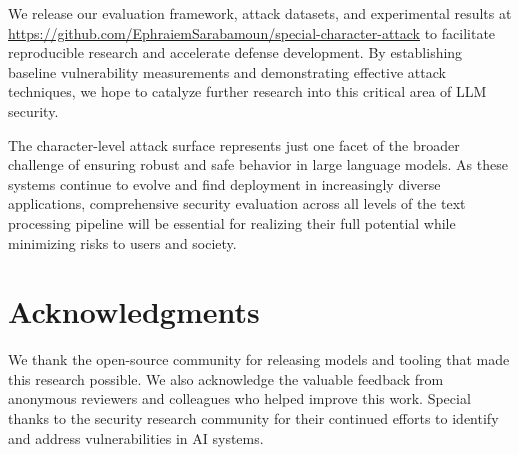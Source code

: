 \documentclass[11pt]{article}
\begin{document}
\begin{multicols}{2}
We release our evaluation framework, attack datasets, and experimental results at \url{https://github.com/EphraiemSarabamoun/special-character-attack} to facilitate reproducible research and accelerate defense development. By establishing baseline vulnerability measurements and demonstrating effective attack techniques, we hope to catalyze further research into this critical area of LLM security.

The character-level attack surface represents just one facet of the broader challenge of ensuring robust and safe behavior in large language models. As these systems continue to evolve and find deployment in increasingly diverse applications, comprehensive security evaluation across all levels of the text processing pipeline will be essential for realizing their full potential while minimizing risks to users and society.

\end{multicols}

\section*{Acknowledgments}
We thank the open-source community for releasing models and tooling that made this research possible. We also acknowledge the valuable feedback from anonymous reviewers and colleagues who helped improve this work. Special thanks to the security research community for their continued efforts to identify and address vulnerabilities in AI systems.



\end{document}
